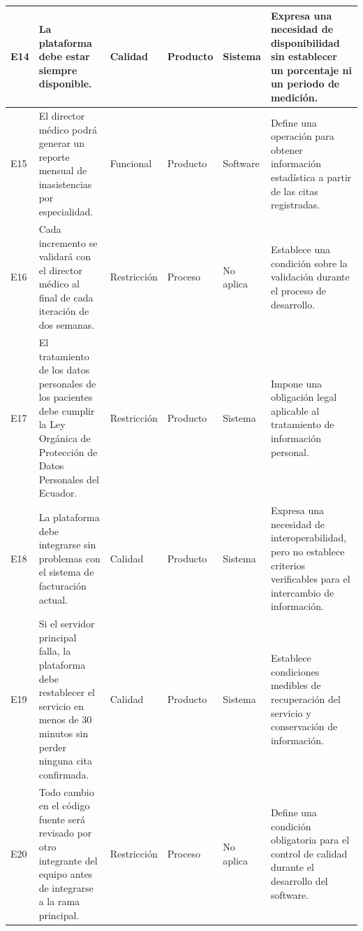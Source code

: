 \documentclass[12pt,a4paper]{article}
\begin{document}
\begin{landscape}
\begin{longtable}{
P{0.8cm}
P{8.6cm}
P{2.5cm}
P{1.6cm}
P{1.6cm}
P{9.0cm}
}
\midrule

E14 &
La plataforma debe estar
siempre disponible. &
Calidad &
Producto &
Sistema &
Expresa una necesidad de disponibilidad
sin establecer un porcentaje ni
un periodo de medición.\\

\midrule

E15 &
El director médico podrá generar
un reporte mensual de inasistencias
por especialidad. &
Funcional &
Producto &
Software &
Define una operación para obtener
información estadística a partir
de las citas registradas.\\

\midrule

E16 &
Cada incremento se validará con
el director médico al final de cada
iteración de dos semanas. &
Restricción &
Proceso &
No aplica &
Establece una condición sobre
la validación durante el
proceso de desarrollo.\\

\midrule

E17 &
El tratamiento de los datos personales
de los pacientes debe cumplir la Ley
Orgánica de Protección de Datos
Personales del Ecuador. &
Restricción &
Producto &
Sistema &
Impone una obligación legal
aplicable al tratamiento de
información personal.\\

\midrule

E18 &
La plataforma debe integrarse sin
problemas con el sistema de
facturación actual. &
Calidad &
Producto &
Sistema &
Expresa una necesidad de interoperabilidad,
pero no establece criterios verificables
para el intercambio de información.\\

\midrule

E19 &
Si el servidor principal falla,
la plataforma debe restablecer el
servicio en menos de 30 minutos
sin perder ninguna cita confirmada. &
Calidad &
Producto &
Sistema &
Establece condiciones medibles
de recuperación del servicio y
conservación de información.\\

\midrule

E20 &
Todo cambio en el código fuente
será revisado por otro integrante
del equipo antes de integrarse
a la rama principal. &
Restricción &
Proceso &
No aplica &
Define una condición obligatoria
para el control de calidad durante
el desarrollo del software.\\

\bottomrule

\end{longtable}

\normalsize

\end{landscape}
\end{document}
